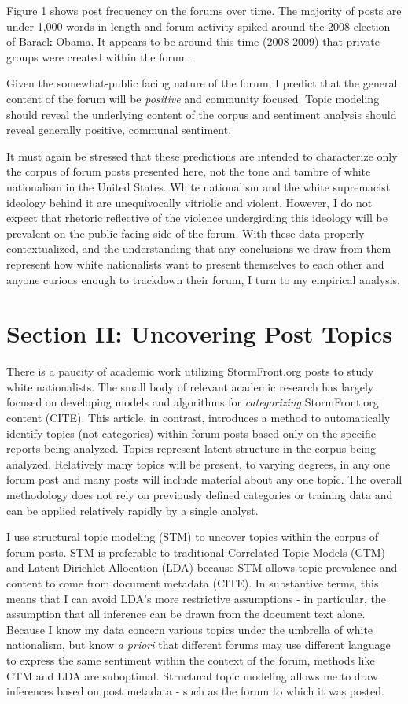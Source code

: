 \documentclass[12pt]{paper}
\begin{document}
Figure 1 shows post frequency on the forums over time. The majority of posts are under 1,000 words in length and forum activity spiked around the 2008 election of Barack Obama. It appears to be around this time (2008-2009) that private groups were created within the forum.

Given the somewhat-public facing nature of the forum, I predict that the general content of the forum will be \textit{positive} and community focused. Topic modeling should reveal the underlying content of the corpus and sentiment analysis should reveal generally positive, communal sentiment.

It must again be stressed that these predictions are intended to characterize only the corpus of forum posts presented here, not the tone and tambre of white nationalism in the United States. White nationalism and the white supremacist ideology behind it are unequivocally vitriolic and violent. However, I do not expect that rhetoric reflective of the violence undergirding this ideology will be prevalent on the public-facing side of the forum. With these data properly contextualized, and the understanding that any conclusions we draw from them represent how white nationalists want to present themselves to each other and anyone curious enough to trackdown their forum, I turn to my empirical analysis.

\section{Section II: Uncovering Post Topics}
There is a paucity of academic work utilizing StormFront.org posts to study white nationalists. The small body of relevant academic research has largely focused on developing models and algorithms for \textit{categorizing} StormFront.org content (CITE). This article, in contrast, introduces a method to automatically identify topics (not categories) within forum posts based only on the specific reports being analyzed. Topics represent latent structure in the corpus being analyzed. Relatively many topics will be present, to varying degrees, in any one forum post and many posts will include material about any one topic. The overall methodology does not rely on previously defined categories or training data and can be applied relatively rapidly by a single analyst.

I use structural topic modeling (STM) to uncover topics within the corpus of forum posts. STM is preferable to traditional Correlated Topic Models (CTM) and Latent Dirichlet Allocation (LDA) because STM allows topic prevalence and content to come from document metadata (CITE). In substantive terms, this means that I can avoid LDA’s more restrictive assumptions - in particular, the assumption that all inference can be drawn from the document text alone. Because I know my data concern various topics under the umbrella of white nationalism, but know \textit{a priori} that different forums may use different language to express the same sentiment within the context of the forum, methods like CTM and LDA are suboptimal. Structural topic modeling allows me to draw inferences based on post metadata - such as the forum to which it was posted.
\end{document}
